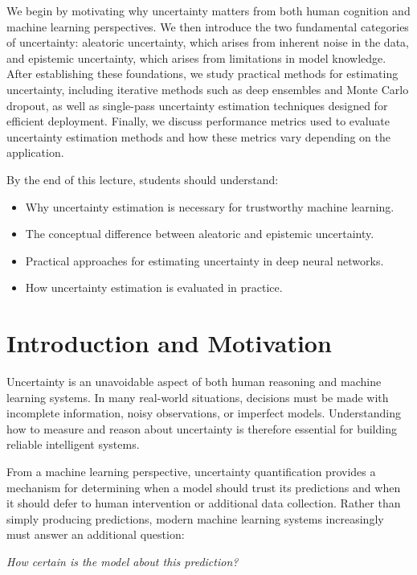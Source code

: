 \documentclass{article}
\begin{document}
We begin by motivating why uncertainty matters from both human cognition and machine learning perspectives. We then introduce the two fundamental categories of uncertainty: aleatoric uncertainty, which arises from inherent noise in the data, and epistemic uncertainty, which arises from limitations in model knowledge. After establishing these foundations, we study practical methods for estimating uncertainty, including iterative methods such as deep ensembles and Monte Carlo dropout, as well as single-pass uncertainty estimation techniques designed for efficient deployment. Finally, we discuss performance metrics used to evaluate uncertainty estimation methods and how these metrics vary depending on the application.

By the end of this lecture, students should understand:
\begin{itemize}
\item Why uncertainty estimation is necessary for trustworthy machine learning.
\item The conceptual difference between aleatoric and epistemic uncertainty.
\item Practical approaches for estimating uncertainty in deep neural networks.
\item How uncertainty estimation is evaluated in practice.
\end{itemize}


\section{Introduction and Motivation}

Uncertainty is an unavoidable aspect of both human reasoning and machine learning systems. In many real-world situations, decisions must be made with incomplete information, noisy observations, or imperfect models. Understanding how to measure and reason about uncertainty is therefore essential for building reliable intelligent systems.

From a machine learning perspective, uncertainty quantification provides a mechanism for determining when a model should trust its predictions and when it should defer to human intervention or additional data collection. Rather than simply producing predictions, modern machine learning systems increasingly must answer an additional question:

\begin{center}
\textit{How certain is the model about this prediction?}
\end{center}
\end{document}
